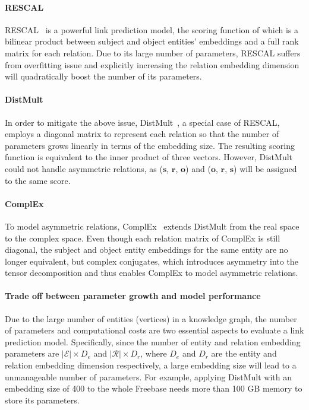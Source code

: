 \documentclass[letterpaper]{article} \usepackage{aaai20}  \usepackage{times}  \usepackage{helvet} \usepackage{courier}  \usepackage{booktabs}
\begin{document}
\paragraph{RESCAL} RESCAL~\cite{nickel2011three} is a powerful link prediction model, the scoring function of which is a bilinear product between subject and object entities' embeddings and a full rank matrix for each relation. Due to its large number of parameters, RESCAL suffers from overfitting issue and explicitly increasing the relation embedding dimension will quadratically boost the number of its parameters. 

\paragraph{DistMult} 
In order to mitigate the above issue, DistMult~\cite{yang2014embedding}, a special case of RESCAL, employs a diagonal matrix to represent each relation so that the number of parameters grows linearly in terms of the embedding size. The resulting scoring function is equivalent to the inner product of three vectors. However, DistMult could not handle asymmetric relations, as ($\mathbf{s}$, $\mathbf{r}$, $\mathbf{o}$) and ($\mathbf{o}$, $\mathbf{r}$, $\mathbf{s}$) will be assigned to the same score.

\paragraph{ComplEx} To model asymmetric relations, ComplEx~\cite{trouillon2016complex} extends DistMult from the real space to the complex space. Even though each relation
matrix of ComplEx is still diagonal, the subject and object entity embeddings for the same entity are no longer equivalent, but complex conjugates, which introduces asymmetry into the tensor decomposition and thus enables ComplEx to model asymmetric relations.

\paragraph{Trade off between parameter growth and model performance}
Due to the large number of entities (vertices) in a knowledge graph, the number of parameters and computational costs are two essential aspects to evaluate a link prediction model. Specifically, since the number of entity and relation embedding parameters are $|\mathcal{E}| \times D_{e}$ and $|\mathcal{R}| \times D_{r}$, where $D_{e}$ and $D_{r}$ are the entity and relation embedding dimension respectively, a large embedding size will lead to a unmanageable number of parameters. For example, applying DistMult with an embedding size of 400 to the whole Freebase needs more than 100 GB memory to store its parameters.
\end{document}
